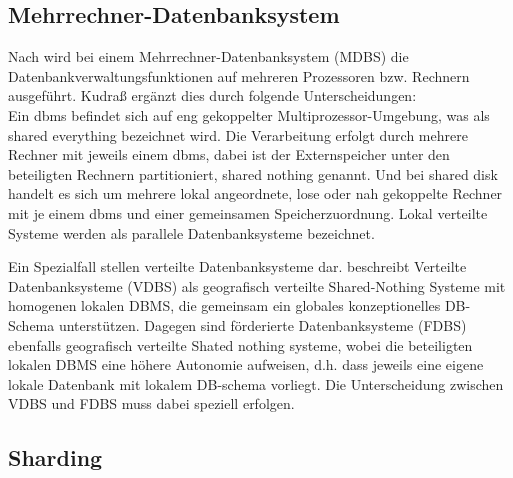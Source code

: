 \subsection{Mehrrechner-Datenbanksystem}
Nach \cite[S.394]{book:kudrass} wird bei einem Mehrrechner-Datenbanksystem (MDBS) die Datenbankverwaltungsfunktionen auf mehreren Prozessoren bzw. Rechnern ausgeführt.
Kudraß ergänzt dies durch folgende Unterscheidungen:\\
Ein \Gls{dbms} befindet sich auf eng gekoppelter Multiprozessor-Umgebung, was als shared everything bezeichnet wird.
Die Verarbeitung erfolgt durch mehrere Rechner mit jeweils einem \Gls{dbms}, dabei ist der Externspeicher unter den beteiligten Rechnern partitioniert, shared nothing genannt.
Und bei shared disk handelt es sich um mehrere lokal angeordnete, lose oder nah gekoppelte Rechner mit je einem \Gls{dbms} und einer gemeinsamen Speicherzuordnung. Lokal verteilte Systeme werden als parallele Datenbanksysteme bezeichnet.

Ein Spezialfall stellen verteilte Datenbanksysteme dar.
\cite[S.398]{book:kudrass} beschreibt Verteilte Datenbanksysteme (VDBS) als geografisch verteilte Shared-Nothing Systeme mit homogenen lokalen DBMS, die gemeinsam ein globales konzeptionelles DB-Schema unterstützen.
Dagegen sind förderierte Datenbanksysteme (FDBS) ebenfalls geografisch verteilte Shated nothing systeme, wobei die beteiligten lokalen DBMS eine höhere Autonomie aufweisen, d.h. dass jeweils eine eigene lokale Datenbank mit lokalem DB-schema vorliegt.
Die Unterscheidung zwischen VDBS und FDBS muss dabei speziell erfolgen.

%
%
%

\subsection{Sharding}

